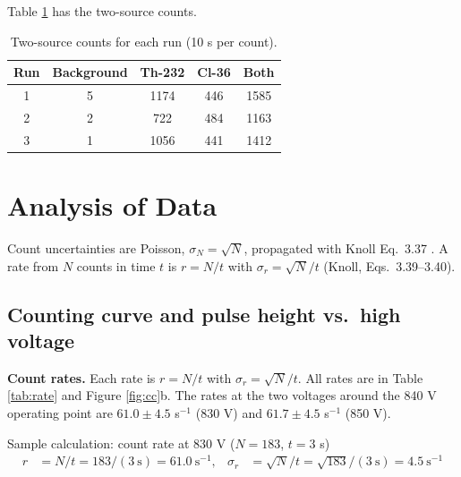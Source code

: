 \documentclass[12pt]{article}
\begin{document}
Table \ref{tab:rawtwo} has the two-source counts.

\begin{table}[!htbp]
\centering\small
\begin{tabular}{ccccc}
\toprule
\textbf{Run} & \textbf{Background} & \textbf{Th-232} & \textbf{Cl-36} & \textbf{Both} \\
\midrule
1 & 5 & 1174 & 446 & 1585 \\
2 & 2 & 722 & 484 & 1163 \\
3 & 1 & 1056 & 441 & 1412 \\
\bottomrule
\end{tabular}
\caption{Two-source counts for each run (10 s per count).}
\label{tab:rawtwo}
\end{table}


\section{Analysis of Data}

Count uncertainties are Poisson, $\sigma_N = \sqrt{N}$, propagated with Knoll Eq.\ 3.37 \cite{knoll}. A rate from $N$ counts in time $t$ is $r = N/t$ with $\sigma_r = \sqrt{N}/t$ (Knoll, Eqs.\ 3.39--3.40).

\subsection{Counting curve and pulse height vs.\ high voltage}

\textbf{Count rates.} Each rate is $r = N/t$ with $\sigma_r = \sqrt{N}/t$. All rates are in Table \ref{tab:rate} and Figure \ref{fig:cc}b. The rates at the two voltages around the 840 V operating point are $61.0 \pm 4.5$ s$^{-1}$ (830 V) and $61.7 \pm 4.5$ s$^{-1}$ (850 V).

\begin{samplecalc}{Sample calculation: count rate at 830 V ($N = 183$, $t = 3$ s)}
\begin{align*}
r &= N/t = 183/(3\ \text{s}) = 61.0\ \text{s}^{-1}, &
\sigma_r &= \sqrt{N}/t = \sqrt{183}/(3\ \text{s}) = 4.5\ \text{s}^{-1}
\end{align*}
\end{samplecalc}
\end{document}
